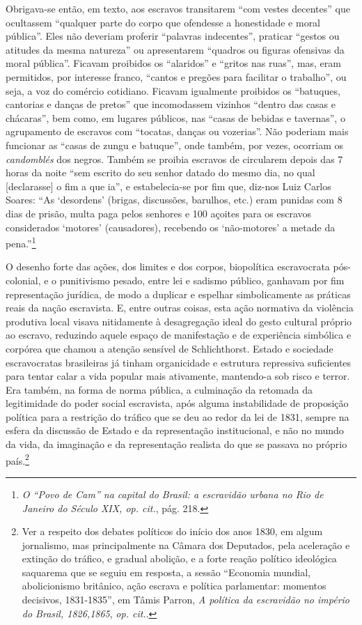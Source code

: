 Obrigava-se então, em texto, aos escravos transitarem ``com vestes
decentes'' que ocultassem ``qualquer parte do corpo que ofendesse a
honestidade e moral pública''. Eles não deveriam proferir ``palavras
indecentes'', praticar ``gestos ou atitudes da mesma natureza'' ou
apresentarem ``quadros ou figuras ofensivas da moral pública''. Ficavam
proibidos os ``alaridos'' e ``gritos nas ruas'', mas, eram permitidos,
por interesse franco, ``cantos e pregões para facilitar o trabalho'', ou
seja, a voz do comércio cotidiano. Ficavam igualmente proibidos os
``batuques, cantorias e danças de pretos'' que incomodassem vizinhos
``dentro das casas e chácaras'', bem como, em lugares públicos, nas
``casas de bebidas e tavernas'', o agrupamento de escravos com
``tocatas, danças ou vozerias''. Não poderiam mais funcionar as ``casas
de zungu e batuque'', onde também, por vezes, ocorriam os
\emph{candomblés} dos negros. Também se proibia escravos de circularem
depois das 7 horas da noite ``sem escrito do seu senhor datado do mesmo
dia, no qual {[}declarasse{]} o fim a que ia'', e estabelecia-se por fim
que, diz-nos Luiz Carlos Soares: ``As `desordens' (brigas, discussões,
barulhos, etc.) eram punidas com 8 dias de prisão, multa paga pelos
senhores e 100 açoites para os escravos considerados `motores'
(causadores), recebendo os `não-motores' a metade da pena.''\footnote{\emph{O
  ``Povo de Cam'' na capital do Brasil: a escravidão urbana no Rio de
  Janeiro do Século XIX, op. cit.}, pág. 218.}

O desenho forte das ações, dos limites e dos corpos, biopolítica
escravocrata pós-colonial, e o punitivismo pesado, entre lei e sadismo
público, ganhavam por fim representação jurídica, de modo a duplicar e
espelhar simbolicamente as práticas reais da nação escravista. E, entre
outras coisas, esta ação normativa da violência produtiva local visava
nitidamente à desagregação ideal do gesto cultural próprio ao escravo,
reduzindo aquele espaço de manifestação e de experiência simbólica e
corpórea que chamou a atenção sensível de Schlichthorst. Estado e
sociedade escravocratas brasileiras já tinham organicidade e estrutura
repressiva suficientes para tentar calar a vida popular mais ativamente,
mantendo-a sob risco e terror. Era também, na forma de norma pública, a
culminação da retomada da legitimidade do poder social escravista, após
alguma instabilidade de proposição política para a restrição do tráfico
que se deu ao redor da lei de 1831, sempre na esfera da discussão de
Estado e da representação institucional, e não no mundo da vida, da
imaginação e da representação realista do que se passava no próprio
país.\footnote{Ver a respeito dos debates políticos do início dos anos
  1830, em algum jornalismo, mas principalmente na Câmara dos Deputados,
  pela aceleração e extinção do tráfico, e gradual abolição, e a forte
  reação político ideológica saquarema que se seguiu em resposta, a
  sessão ``Economia mundial, abolicionismo britânico, ação escrava e
  política parlamentar: momentos decisivos, 1831-1835'', em Tâmis
  Parron, \emph{A política da escravidão no império do Brasil,
  1826,1865}, \emph{op. cit.}.}

